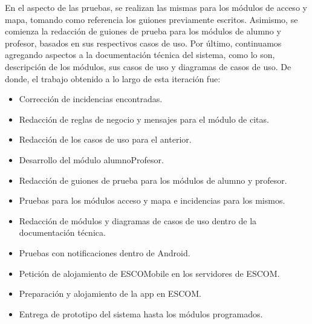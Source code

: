 En el aspecto de las pruebas, se realizan las mismas para los módulos de acceso y mapa, tomando como referencia los guiones previamente escritos. Asimismo, se comienza la redacción de guiones de prueba para los módulos de alumno y profesor, basados en sus respectivos casos de uso. 
\newline
\newline
Por último, continuamos agregando aspectos a la documentación técnica del sistema, como lo son, descripción de los módulos, sus casos de uso y diagramas de casos de uso.
\newline
De donde, el trabajo obtenido a lo largo de esta iteración fue:
\begin{itemize}
	\item Corrección de incidencias encontradas.
	\item Redacción de reglas de negocio y mensajes para el módulo de citas.
	\item Redacción de los casos de uso para el anterior.
	\item Desarrollo del módulo alumnoProfesor.
	\item Redacción de guiones de prueba para los módulos de alumno y profesor.
	\item Pruebas para los módulos acceso y mapa e incidencias para los mismos.
	\item Redacción de módulos y diagramas de casos de uso dentro de la documentación técnica.
	\item Pruebas con notificaciones dentro de Android.
	\item Petición de alojamiento de ESCOMobile en los servidores de ESCOM.
	\item Preparación y alojamiento de la app en ESCOM.
	\item Entrega de prototipo del sistema hasta los módulos programados.
\end{itemize}

